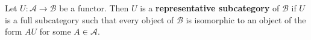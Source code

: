 Let $U: \mathcal{A} \to \mathcal{B}$ be a functor. Then $U$ is a \textbf{representative subcategory} of $\mathcal{B}$ if $U$ is a full subcategory such that every object of $\mathcal{B}$ is isomorphic to an object of the form $AU$ for some $A \in \mathcal{A}$.
